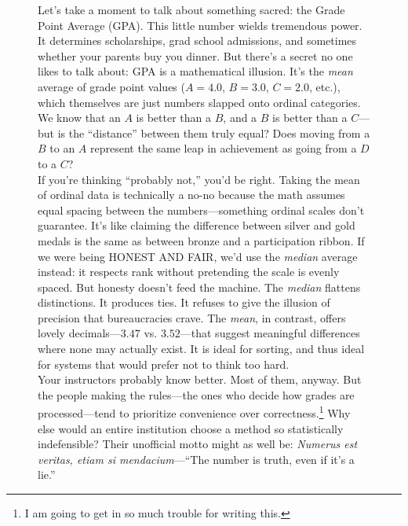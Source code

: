 \begin{figure}[htpb]
\begin{mdframed}[nobreak = true, style = miscFrame, frametitle = \Large\IMFellEnglish Box 4.1: The GPA Illusion]
\IMFellEnglish
\begin{spacing}{1.25}
Let’s take a moment to talk about something sacred: the Grade Point Average (GPA). This little number wields tremendous power. It determines scholarships, grad school admissions, and sometimes whether your parents buy you dinner. But there’s a secret no one likes to talk about: GPA is a mathematical illusion. It’s the \textit{mean} average of grade point values ($A = 4.0$, $B = 3.0$, $C = 2.0$, etc.), which themselves are just numbers slapped onto ordinal categories. We know that an $A$ is better than a $B$, and a $B$ is better than a $C$—but is the \enquote{distance} between them truly equal? Does moving from a $B$ to an $A$ represent the same leap in achievement as going from a $D$ to a $C$? \\

If you’re thinking \enquote{probably not,} you’d be right. Taking the mean of ordinal data is technically a no-no because the math assumes equal spacing between the numbers—something ordinal scales don’t guarantee. It's like claiming the difference between silver and gold medals is the same as between bronze and a participation ribbon. If we were being HONEST AND FAIR, we’d use the \textit{median} average instead: it respects rank without pretending the scale is evenly spaced. But honesty doesn’t feed the machine. The \textit{median} flattens distinctions. It produces ties. It refuses to give the illusion of precision that bureaucracies crave. The \textit{mean}, in contrast, offers lovely decimals—$3.47$ vs. $3.52$—that suggest meaningful differences where none may actually exist. It is ideal for sorting, and thus ideal for systems that would prefer not to think too hard. \\

Your instructors probably know better. Most of them, anyway. But the people making the rules—the ones who decide how grades are processed—tend to prioritize convenience over correctness.\footnote{I am going to get in so much trouble for writing this.} Why else would an entire institution choose a method so statistically indefensible? Their unofficial motto might as well be: \textit{Numerus est veritas, etiam si mendacium}—\enquote{The number is truth, even if it’s a lie.}
\end{spacing}
\end{mdframed}
\end{figure}

